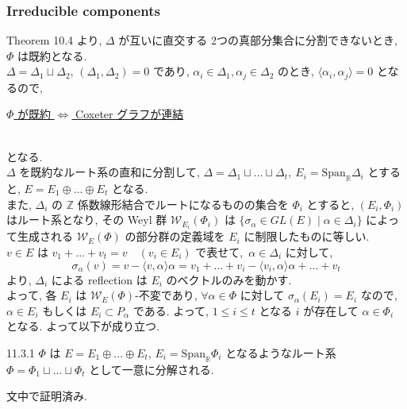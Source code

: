 \documentclass[uplatex,dvipdfmx]{jsarticle}
\begin{document}
\subsubsection{Irreducible components}
Theorem 10.4 より, $\Delta$ が互いに直交する 2つの真部分集合に分割できないとき, $\Phi$ は既約となる.\\
$\Delta = \Delta_1 \sqcup \Delta_2$, $(\Delta_1, \Delta_2) = 0$ であり, $\alpha_i \in \Delta_1, \alpha_j \in \Delta_2$ のとき, $\langle \alpha_i, \alpha_j \rangle = 0$ となるので,~\\
\centerline{\underline{$\Phi$ が既約 $\iff$ Coxeter グラフが連結}} \\
となる.\\
$\Delta$ を既約なルート系の直和に分割して, $\Delta = \Delta_1 \sqcup \dots \sqcup \Delta_t,~E_i = \mathrm{Span}_{\mathbb{R}} \Delta_i$ とすると, $E = E_1 \oplus \dots \oplus E_t$ となる.\\
また, $\Delta_i$ の $\mathbb{Z}$ 係数線形結合でルートになるものの集合を $\Phi_i$ とすると, $(E_i, \Phi_i)$ はルート系となり, その Weyl 群 $\mathcal{W}_{E_i}(\Phi_i)$ は $\{ \sigma_\alpha \in GL(E) \mid \alpha \in \Delta_i \}$ によって生成される $\mathcal{W}_E(\Phi)$ の部分群の定義域を $E_i$ に制限したものに等しい.\\
$v \in E$ は $v_1 + \dots + v_t = v \quad (v_i \in E_i)$ で表せて,~$\alpha \in \Delta_i$ に対して, 
\begin{equation*}
    \sigma_\alpha(v) = v - \langle v, \alpha \rangle \alpha = v_1 + \dots + v_i - \langle v_i, \alpha \rangle \alpha + \dots + v_t
\end{equation*}
より, $\Delta_i$ による reflection は $E_i$ のベクトルのみを動かす.\\
よって, 各 $E_i$ は $\mathcal{W}_E(\Phi)$-不変であり, $\forall \alpha \in \Phi$ に対して $\sigma_\alpha(E_i) = E_i$ なので, $\alpha \in E_i$ もしくは $E_i \subset P_\alpha$ である. よって, $1 \le i \le t$ となる $i$ が存在して $\alpha \in \Phi_i$ となる. よって以下が成り立つ.
\begin{myprop}{11.3.1}
    $\Phi$ は $E = E_1 \oplus \dots \oplus E_t$, $E_i = \mathrm{Span}_{\mathbb{R}} \Phi_i$ となるようなルート系 $\Phi = \Phi_1 \sqcup \dots \sqcup \Phi_t$ として一意に分解される.
\end{myprop}
\begin{myproof}
    文中で証明済み.
\end{myproof}
\newpage
\end{document}
